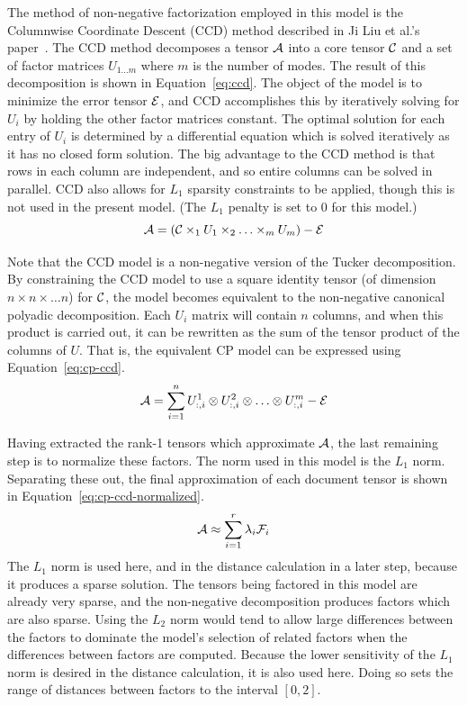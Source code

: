 \documentclass[../ut-dissertation.tex]{subfiles}
\begin{document}
The method of non-negative factorization employed in this model is the
Columnwise Coordinate Descent (CCD) method described in Ji Liu et al.'s
paper~\cite{liu2012sparse}. The CCD method decomposes a tensor
$\mathcal{A}$ into a
core tensor $\mathcal{C}$ and a set of factor matrices $U_{1\ldots m}$
where $m$ is the number of modes.  The result of this decomposition is
shown in Equation~\ref{eq:ccd}.  The object of the model is to
minimize the error tensor $\mathcal{E}$, and CCD accomplishes this by
iteratively solving for $U_i$ by holding the other factor matrices
constant.  The optimal solution for each entry of $U_i$ is determined by
a differential equation which is solved iteratively as it has no
closed form solution.  The big advantage to the CCD method is that
rows in each column are independent, and so entire columns can be
solved in parallel.  CCD also allows for $L_1$ sparsity constraints to
be applied, though this is not used in the present model.  (The $L_1$
penalty is set to 0 for this model.)  
\begin{equation}
  \label{eq:ccd}
  \mathcal{A} = (\mathcal{C} \times_1 U_1 \times_2 \ldots \times_m U_m) - \mathcal{E}
\end{equation}

Note that the CCD model is a non-negative version of the Tucker
decomposition. By constraining the CCD model to use a square identity
tensor (of dimension $n \times n \times \ldots n$) for
$\mathcal{C}$, the model becomes equivalent to the non-negative canonical
polyadic decomposition.  Each $U_i$ matrix will contain $n$ columns,
and when this product is carried out, it can be rewritten as the sum
of the tensor product of the columns of $U$.  That is, the equivalent
CP model can be expressed using Equation~\ref{eq:cp-ccd}.
\begin{equation}
  \label{eq:cp-ccd}
  \mathcal{A} = \displaystyle\sum_{i=1}^n U^1_{:,i} \otimes U^2_{:,i} \otimes \ldots
  \otimes U^m_{:,i} - \mathcal{E}
\end{equation}

Having extracted the rank-1 tensors which approximate $\mathcal{A}$, the
last remaining step is to normalize these factors.  The norm used in
this model is the $L_1$ norm.  Separating these out, the final
approximation of each document tensor is shown in
Equation~\ref{eq:cp-ccd-normalized}.
\begin{equation}
  \label{eq:cp-ccd-normalized}
  \mathcal{A} \approx \displaystyle\sum_{i=1}^r \lambda_i \mathcal{F}_i
\end{equation}
The $L_1$ norm is used here, and in the distance calculation in a
later step, because it produces a sparse solution.  The tensors being
factored in this model are already very sparse, and the non-negative
decomposition produces factors which are also sparse.  Using the $L_2$
norm would tend to allow large differences between the factors to 
dominate the model's selection of related factors when the differences
between factors are computed. Because the lower sensitivity of the
$L_1$ norm is desired in the distance calculation, it is also used
here.  Doing so sets the range of distances between factors to the
interval $[0,2]$.
\end{document}
